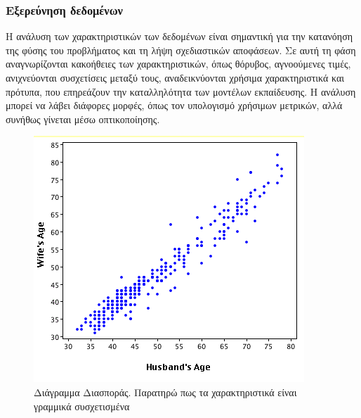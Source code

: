 \documentclass{article}
\begin{document}
\subsubsection{Εξερεύνηση δεδομένων}
Η ανάλυση των χαρακτηριστικών των δεδομένων είναι σημαντική για την κατανόηση της φύσης του προβλήματος και τη λήψη σχεδιαστικών αποφάσεων. Σε αυτή τη φάση αναγνωρίζονται κακοήθειες των χαρακτηριστικών, όπως θόρυβος, αγνοούμενες τιμές, ανιχνεύονται συσχετίσεις μεταξύ τους, αναδεικνύονται χρήσιμα χαρακτηριστικά και πρότυπα, που επηρεάζουν την καταλληλότητα των μοντέλων εκπαίδευσης. Η ανάλυση μπορεί να λάβει διάφορες μορφές, όπως τον υπολογισμό χρήσιμων μετρικών, αλλά συνήθως γίνεται μέσω οπτικοποίησης.
\begin{figure}[H]
    \centering
    \begin{minipage}{.5\textwidth}
        \centering
        \includegraphics[width=0.8\linewidth, height=0.15\textheight]{scatter.png}
        \caption[Διάγραμμα διασποράς]{Διάγραμμα Διασποράς. Παρατηρώ πως τα χαρακτηριστικά είναι
γραμμικά συσχετισμένα}
        

\end{minipage}
\end{figure}
\end{document}
